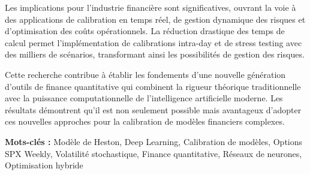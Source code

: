 Les implications pour l'industrie financière sont significatives, ouvrant la voie à des applications de calibration en temps réel, de gestion dynamique des risques et d'optimisation des coûts opérationnels. La réduction drastique des temps de calcul permet l'implémentation de calibrations intra-day et de stress testing avec des milliers de scénarios, transformant ainsi les possibilités de gestion des risques.

Cette recherche contribue à établir les fondements d'une nouvelle génération d'outils de finance quantitative qui combinent la rigueur théorique traditionnelle avec la puissance computationnelle de l'intelligence artificielle moderne. Les résultats démontrent qu'il est non seulement possible mais avantageux d'adopter ces nouvelles approches pour la calibration de modèles financiers complexes.

\textbf{Mots-clés :} Modèle de Heston, Deep Learning, Calibration de modèles, Options SPX Weekly, Volatilité stochastique, Finance quantitative, Réseaux de neurones, Optimisation hybride
